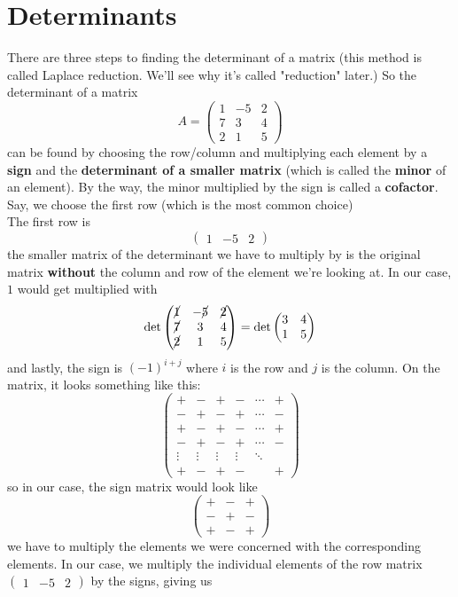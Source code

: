 \documentclass[oneside]{book}
\numberwithin{equation}{chapter} %
\begin{document}
\section{Determinants}
There are three steps to finding the determinant of a matrix (this method is called Laplace reduction. We'll see why it's called "reduction" later.) So the determinant of a matrix 
$$
A=
\begin{pmatrix}
	1&-5&2\\7&3&4\\2&1&5
\end{pmatrix}
$$
can be found by choosing the row/column and multiplying each element by a  \textbf{sign}  and the \textbf{determinant of a smaller matrix} (which is called the \textbf{minor} of an element). By the way, the minor multiplied by the sign is called a \textbf{cofactor}. Say, we choose the first row (which is the most common choice)\\
The first row is 
$$
\begin{pmatrix}
	1&-5&2
\end{pmatrix}
$$
the smaller matrix of the determinant we have to multiply by is the original matrix  \textbf{without} the column and row of the element we're looking at. In our case, $1$ would get multiplied with 
$$
\det
\begin{pmatrix}
	\cancel{1}&-\cancel{5}&\cancel{2}\\\cancel{7}&3&4\\\cancel{2}&1&5
\end{pmatrix}
=\det
\begin{pmatrix}
	3&4\\1&5
\end{pmatrix}
$$
and lastly, the sign is $(-1)^{i+j}$ where $i$ is the row and $j$ is the column. On the matrix, it looks something like this:
$$
\begin{pmatrix}
	+&-&+&-&\cdots&+\\
	-&+&-&+&\cdots&-\\
	+&-&+&-&\cdots&+\\
	-&+&-&+&\cdots&-\\
	\vdots&\vdots&\vdots&\vdots&\ddots&\\
	+&-&+&-&&+
\end{pmatrix}
$$
so in our case, the sign matrix would look like 
$$
\begin{pmatrix}
	+&-&+\\-&+&-\\+&-&+
\end{pmatrix}
$$
we have to multiply the elements we were concerned with the corresponding elements. In our case, we multiply the individual elements of the row matrix $\begin{pmatrix}
	1&-5&2
\end{pmatrix}$ by the signs, giving us 
\end{document}
